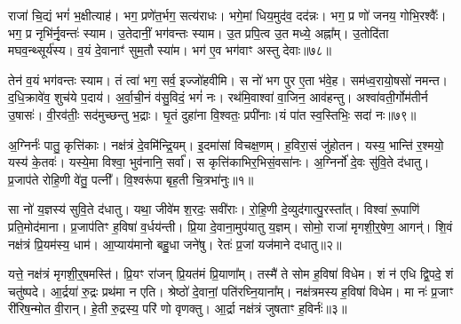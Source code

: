 राजा॑ चि॒द्यं भगं॑ भ॒क्षीत्याह॑।
भग॒ प्रणे॑त॒र्भग॒ सत्य॑राधः।
भगे॒मां धिय॒मुद॑व॒ दद॑न्नः।
भग॒ प्र णो॑ जनय॒ गोभि॒रश्वैः᳚।
भग॒ प्र नृभि॑र्नृ॒वन्तः॑ स्याम।
उ॒तेदानीं॒ भग॑वन्तः स्याम।
उ॒त प्रपि॒त्व उ॒त मध्ये॒ अह्ना᳚म्।
उ॒तोदि॑ता मघव॒न्थ्सूर्य॑स्य।
व॒यं दे॒वानाꣳ॑ सुम॒तौ स्या॑म।
भग॑ ए॒व भग॑वाꣳ अस्तु देवाः॥७८॥\ip

तेन॑ व॒यं भग॑वन्तः स्याम।
तं त्वा॑ भग॒ सर्व॒ इज्जो॑हवीमि।
स नो॑ भग पुर ए॒ता भ॑वे॒ह।
सम॑ध्व॒रायो॒षसो॑ नमन्त।
द॒धि॒क्रावे॑व॒ शुच॑ये प॒दाय॑।
अ॒र्वा॒ची॒नं व॑सु॒विदं॒ भगं॑ नः।
रथ॑मि॒वाश्वा॑ वा॒जिन॒ आव॑हन्तु।
अश्वा॑वती॒र्गोम॑तीर्न उ॒षासः॑।
वी॒रव॑तीः॒ सद॑मुच्छन्तु भ॒द्राः।
घृ॒तं दुहा॑ना वि॒श्वतः॒ प्रपी॑नाः।यं पा॑त स्व॒स्तिभिः॒ सदा॑ नः॥७९॥\ip\anuvakamend[वि॒च॒क्ष॒णा वि॑चर्तु॒रꣳ शर्म॒न्नधि॑ वि॒सर्ज॑नाय॒ ब्रह्म॒ वनं॒ ब्रह्म॒ स वृ॒क्ष आ॑सीत्तु॒रश्चि॑द्देवाः॒ प्रपी॑ना॒ एकं॑ च]


\clearpage

\setcounter{anuvakam}{0}

अ॒ग्निर्नः॑ पातु॒ कृत्ति॑काः।
नक्ष॑त्रं दे॒वमि॑न्द्रि॒यम्।
इ॒दमा॑सां विचक्ष॒णम्।
ह॒विरा॒सं जु॑होतन।
यस्य॒ भान्ति॑ र॒श्मयो॒ यस्य॑ के॒तवः॑।
यस्ये॒मा विश्वा॒ भुव॑नानि॒ सर्वा᳚।
स कृत्ति॑काभि\-र॒भिसं॒वसा॑नः।
अ॒ग्निर्नो॑ दे॒वः सु॑वि॒ते द॑धातु।
प्र॒जा\-प॑ते रोहि॒णी वे॑तु॒ पत्नी᳚।
वि॒श्वरू॑पा बृह॒ती चि॒त्रभा॑नुः॥१॥\ip

सा नो॑ य॒ज्ञस्य॑ सुवि॒ते द॑धातु।
यथा॒ जीवे॑म श॒रदः॒ सवी॑राः।
रो॒हि॒णी दे॒व्युद॑गात्पु॒रस्ता᳚त्।
विश्वा॑ रू॒पाणि॑ प्रति॒मोद॑माना।
प्र॒जा\-प॑तिꣳ ह॒विषा॑ व॒र्धय॑न्ती।
प्रि॒या दे॒वाना॒मुप॑यातु य॒ज्ञम्।
सोमो॒ राजा॑ मृगशी॒र्॒‌षेण॒ आगन्॑।
शि॒वं नक्ष॑त्रं प्रि॒यम॑स्य॒ धाम॑।
आ॒प्याय॑मानो बहु॒धा जने॑षु।
रेतः॑ प्र॒जां यज॑माने दधातु॥२॥\ip

यत्ते॒ नक्ष॑त्रं मृगशी॒र्॒‌षमस्ति॑।
प्रि॒यꣳ रा॑जन् प्रि॒यत॑मं प्रि॒याणा᳚म्।
तस्मै॑ ते सोम ह॒विषा॑ विधेम।
शं न॑ एधि द्वि॒पदे॒ शं चतु॑ष्पदे।
आ॒र्द्रया॑ रु॒द्रः प्रथ॑मा न एति।
श्रेष्ठो॑ दे॒वानां॒ पति॑रघ्नि॒याना᳚म्।
नक्ष॑त्रमस्य ह॒विषा॑ विधेम।
मा नः॑ प्र॒जाꣳ री॑रिष॒न्मोत वी॒रान्।
हे॒ती रु॒द्रस्य॒ परि॑ णो वृणक्तु।
आ॒र्द्रा नक्ष॑त्रं जुषताꣳ ह॒विर्नः॑॥३॥\ip

